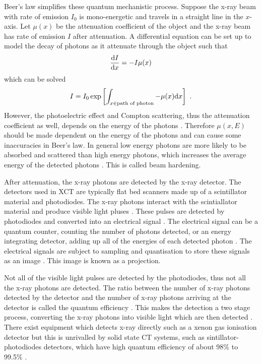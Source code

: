 Beer's law simplifies these quantum mechanistic process. Suppose the x-ray beam with rate of emission $I_0$ is mono-energetic and travels in a straight line in the $x$-axis. Let $\mu(x)$ be the attenuation coefficient of the object and the x-ray beam has rate of emission $I$ after attenuation. A differential equation can be set up to model the decay of photons as it attenuate through the object such that
\begin{equation}
\dfrac{\mathrm{d} I}{\mathrm{d} x} = -I\mu(x)
\end{equation}
which can be solved
\begin{equation}
I = I_0\exp\left[\int_{x \in \text{path of photon}}-\mu(x)\mathrm{d} x\right] \ .
\label{eq:beerLaw}
\end{equation}
However, the photoelectric effect and Compton scattering, thus the attenuation coefficient as well, depends on the energy of the photons \citep{elbakri2002statistical}. Therefore $\mu(x,E)$ should be made dependent on the energy of the photons \citep{cantatore2011introduction} and can cause some inaccuracies in Beer's law. In general low energy photons are more likely to be absorbed and scattered than high energy photons, which increases the average energy of the detected photons \citep{sun2012overview}. This is called beam hardening.

After attenuation, the x-ray photons are detected by the x-ray detector. The detectors used in XCT are typically flat bed scanners made up of a scintillator material \citep{curran1953luminescence, greskovich1997ceramic} and photodiodes. The x-ray photons interact with the scintiallator material and produce visible light pluses \citep{rossner1993conversion}. These pulses are detected by photodiodes and converted into an electrical signal \citep{nikl2006scintillation, ren2018tutorial}. The electrical signal can be a quantum counter, counting the number of photons detected, or an energy integrating detector, adding up all of the energies of each detected photon \citep{nikl2006scintillation, whiting2006properties, kruth2011computed, ren2018tutorial}. The electrical signals are subject to sampling and quantisation to store these signals as an image \citep{cierniak2011x}. This image is known as a projection.

Not all of the visible light pulses are detected by the photodiodes, thus not all the x-ray photons are detected. The ratio between the number of x-ray photons detected by the detector and the number of x-ray photons arriving at the detector is called the quantum efficiency \citep{cierniak2011x, ren2018tutorial}. This makes the detection a two stage process, converting the x-ray photons into visible light which are then detected \citep{cierniak2011x}. There exist equipment which detects x-ray directly such as a xenon gas ionisation detector \citep{fuchs2000direct} but this is unrivalled by solid state CT systems, such as sintillator-photodiodes detectors, which have high quantum efficiency of about 98\% to 99.5\% \citep{hsieh2000investigation}.

